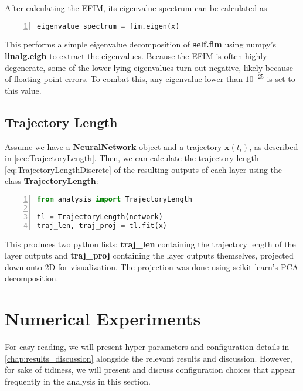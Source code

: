 After calculating the EFIM, its eigenvalue spectrum can be calculated as 

\begin{lstlisting}[language=python, numbers=left]
eigenvalue_spectrum = fim.eigen(x)
\end{lstlisting}
This performs a simple eigenvalue decomposition of \textbf{self.fim} using numpy's \textbf{linalg.eigh} to extract the eigenvalues. Because the EFIM is often highly degenerate, some of the lower lying eigenvalues turn out negative, likely because of floating-point errors. To combat this, any eigenvalue lower than $10^{-25}$ is set to this value. 

\subsection{Trajectory Length}\label{sec:TrajectoryLengthImplement}
Assume we have a \textbf{NeuralNetwork} object and a trajectory $\boldsymbol{x}(t_i)$, as described in \autoref{sec:TrajectoryLength}. Then, we can calculate the trajectory length \autoref{eq:TrajectoryLengthDiscrete} of the resulting outputs of each layer using the class \textbf{TrajectoryLength}:

\begin{lstlisting}[language=python, numbers=left]
from analysis import TrajectoryLength

tl = TrajectoryLength(network)
traj_len, traj_proj = tl.fit(x)
\end{lstlisting}
This produces two python lists: \textbf{traj\_len} containing the trajectory length of the layer outputs and \textbf{traj\_proj} containing the layer outputs themselves, projected down onto 2D for visualization. The projection was done using scikit-learn's \cite{scikit-learn} PCA decomposition. 


\section{Numerical Experiments}\label{sec:Numerical Experiments}
For easy reading, we will present hyper-parameters and configuration details in \autoref{chap:results_discussion} alongside the relevant results and discussion. However, for sake of tidiness, we will present and discuss configuration choices that appear frequently in the analysis in this section.

